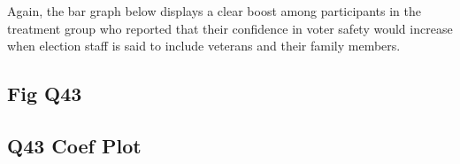 \documentclass[
  11pt,
  a4paper,
]{article}
\begin{document}
Again, the bar graph below displays a clear boost among participants in
the treatment group who reported that their confidence in voter safety
would increase when election staff is said to include veterans and their
family members.

\subsection{Fig Q43}

\begin{figure}


\caption{\label{fig-q43}}

\end{figure}%

\subsection{Q43 Coef Plot}

\begin{figure}


\caption{\label{fig-q43-coefplot}}

\end{figure}%
\end{document}
